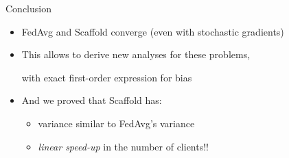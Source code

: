 \documentclass[aspectratio=169,12pt]{beamer}
\begin{document}
\begin{frame}{Conclusion}

  \begin{itemize}[itemsep=1em]
  \item FedAvg and Scaffold converge (even with stochastic gradients)
  \item This allows to derive new analyses for these problems,

    with exact first-order expression for bias
  \item And we proved that Scaffold has:
    \begin{itemize}
    \item variance similar to FedAvg's variance
    \item \textit{linear speed-up} in the number of clients!!
    \end{itemize}

  \end{itemize}
  
\end{frame}
\end{document}

